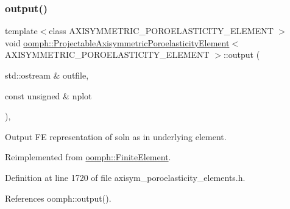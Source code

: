 \subsubsection{\texorpdfstring{output()}{output()}}
{\footnotesize\ttfamily template$<$class A\+X\+I\+S\+Y\+M\+M\+E\+T\+R\+I\+C\+\_\+\+P\+O\+R\+O\+E\+L\+A\+S\+T\+I\+C\+I\+T\+Y\+\_\+\+E\+L\+E\+M\+E\+NT $>$ \\
void \hyperlink{classoomph_1_1ProjectableAxisymmetricPoroelasticityElement}{oomph\+::\+Projectable\+Axisymmetric\+Poroelasticity\+Element}$<$ A\+X\+I\+S\+Y\+M\+M\+E\+T\+R\+I\+C\+\_\+\+P\+O\+R\+O\+E\+L\+A\+S\+T\+I\+C\+I\+T\+Y\+\_\+\+E\+L\+E\+M\+E\+NT $>$\+::output (\begin{DoxyParamCaption}\item[{std\+::ostream \&}]{outfile,  }\item[{const unsigned \&}]{nplot }\end{DoxyParamCaption})\hspace{0.3cm}{\ttfamily [inline]}, {\ttfamily [virtual]}}



Output FE representation of soln as in underlying element. 



Reimplemented from \hyperlink{classoomph_1_1FiniteElement_afa9d9b2670f999b43e6679c9dd28c457}{oomph\+::\+Finite\+Element}.



Definition at line 1720 of file axisym\+\_\+poroelasticity\+\_\+elements.\+h.



References oomph\+::output().

\mbox{\label{classoomph_1_1ProjectableAxisymmetricPoroelasticityElement_a0ae5521eeba28eeef8eb28741597ea44}} 
